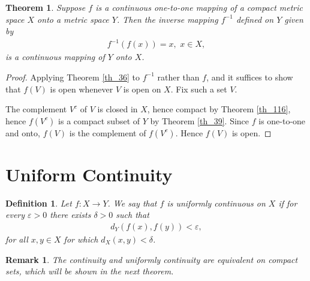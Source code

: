 \documentclass[11pt]{book}
\newtheorem{definition}{Definition}[chapter]
\newtheorem{theorem}{Theorem}[chapter]
\newtheorem{remark}{Remark}[chapter]
\theoremstyle{definition}
\numberwithin{equation}{chapter}
\begin{document}
\medskip

\begin{theorem}
Suppose $f$ is a continuous one-to-one mapping of a compact metric space $X$ onto a metric space $Y$. Then the inverse mapping $f^{-1}$ defined on $Y$ given by
\begin{align*}
    f^{-1}(f(x)) = x, \,\, x \in X,
\end{align*}
is a continuous mapping of $Y$ onto $X$.
\end{theorem}
\begin{proof}
Applying Theorem \ref{th_36} to $f^{-1}$ rather than $f$, and it suffices to show that $f(V)$ is open whenever $V$ is open on $X$. Fix such a set $V$.

The complement $V^c$ of $V$ is closed in $X$, hence compact by Theorem \ref{th_116}, hence $f(V^c)$ is a compact subset of $Y$ by Theorem \ref{th_39}. Since $f$ is one-to-one and onto, $f(V)$ is the complement of $f(V^c)$. Hence $f(V)$ is open.
\end{proof}

\medskip


\section{Uniform Continuity}

\begin{definition}
Let $f: X \to Y$. We say that $f$ is uniformly continuous on $X$ if for every $\varepsilon > 0$ there exists $\delta > 0$ such that 
\begin{align*}
    d_Y(f(x),f(y)) < \varepsilon,
\end{align*}
for all $x,y \in X$ for which $d_X(x,y) < \delta$.
\end{definition}

\begin{remark}
The continuity and uniformly continuity are equivalent on compact sets, which will be shown in the next theorem.
\end{remark}

\medskip
\end{document}
